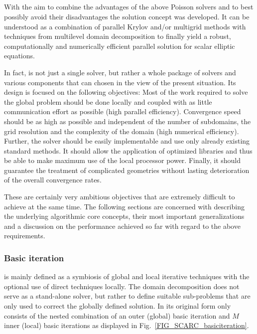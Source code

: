 \subsection{\scarc{}}
\label{SEC_SCARC_scarc}
  
With the aim to combine the advantages of the above Poisson solvers and to best possibly avoid their disadvantages the solution concept \scarc{} was developed. It can be understood as a combination of parallel Krylov and/or multigrid methods with techniques from multilevel domain decomposition to finally yield a robust, computationally and numerically efficient parallel solution for scalar elliptic equations. 

In fact, \scarc{} is not just a single solver, but rather a whole package of solvers and various components that can chosen in the view of the present situation. Its
design is focused on the following objectives: Most of the work required to solve the global problem should be done locally and coupled with as little communication effort as possible (high parallel efficiency). Convergence speed should be as high as possible and independent of the number of subdomains, the grid resolution and the complexity of the domain (high numerical efficiency). Further, the solver should be easily implementable and use only already existing standard methods. It should allow the application of optimized libraries and thus be able to make maximum use of the local processor power. Finally, it should guarantee the treatment of complicated geometries without lasting deterioration of the overall convergence rates. 

These are certainly very ambitious objectives that are extremely difficult to achieve at the same time. 
The following sections are concerned with describing the underlying algorithmic core concepts, their most important generalizations and a discussion on the performance achieved so far with regard to the above requirements.


\subsubsection{Basic \scarc{} iteration}
\scarc{} is mainly defined as a symbiosis of global and local iterative techniques with the optional use of direct techniques locally. 
The domain decomposition does not serve as a stand-alone solver, but rather to define suitable sub-problems that are only used to correct the globally defined solution.
%
In its original form \scarc{} only consists of the
nested combination of an outer (global) basic iteration and $M$ inner (local) basic iterations as displayed in Fig.~\ref{FIG_SCARC_basiciteration}. 

